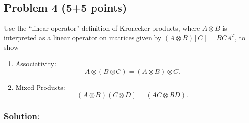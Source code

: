 \documentclass[10pt,oneside]{article}
\begin{document}
\newpage
\subsection*{Problem 4 (5+5 points)}

Use the ``linear operator'' definition of Kronecker products, where $A \otimes B$ is interpreted as a linear operator on matrices given by $(A \otimes B)[C] = BCA^T$, to show

\begin{enumerate}

\item Associativity:
$$A \otimes (B \otimes C) =
(A \otimes B) \otimes C.$$

\item Mixed Products:
$$(A \otimes B)(C \otimes D) =
(AC \otimes BD).$$


 \end{enumerate}

\subsubsection*{Solution:}
\end{document}
